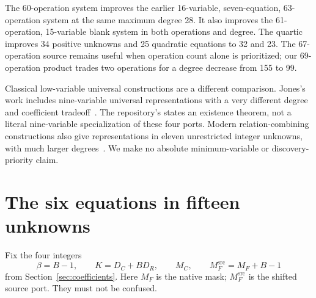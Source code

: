 \documentclass[11pt,a4paper]{article}
\theoremstyle{definition}\newtheorem{definition}[theorem]{Definition}
\theoremstyle{remark}\newtheorem{remark}[theorem]{Remark}
\newcommand{\code}[1]{\texttt{\detokenize{#1}}}
\newcommand{\MF}{M_F^{\mathrm{src}}}
\begin{document}
The 60-operation system improves the earlier 16-variable, seven-equation,
63-operation system at the same maximum degree 28. It also improves the
61-operation, 15-variable blank system in both operations and degree.
The quartic improves 34 positive unknowns and 25 quadratic equations to
32 and 23. The 67-operation source remains useful when operation count
alone is prioritized; our 69-operation product trades two operations for
a degree decrease from 155 to 99.

Classical low-variable universal constructions are a different comparison.
Jones's work includes nine-variable universal representations with a very
different degree and coefficient tradeoff~\cite{jones}. The repository's
\code{Jones1982.nine_unknowns} states an existence theorem, not a literal
nine-variable specialization of these four ports. Modern relation-combining
constructions also give representations in eleven unrestricted integer
unknowns, with much larger degrees~\cite{bayer2025}. We make no absolute
minimum-variable or discovery-priority claim.

\section{The six equations in fifteen unknowns}
\label{sec:system}

Fix the four integers
\begin{equation}\label{eq:ports}
 \beta=B-1,\qquad K=D_C+BD_R,\qquad M_C,\qquad
 \MF=M_F+B-1
\end{equation}
from Section~\ref{sec:coefficients}. Here \(M_F\) is the native mask;
\(\MF\) is the shifted source port. They must not be confused.
\end{document}
